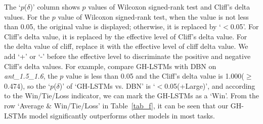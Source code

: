 \documentclass[journal]{IEEEtran}
\begin{document}
The `$p$($\delta$)' column shows $p$ values of Wilcoxon signed-rank test and Cliff's delta values. For the $p$ value of Wilcoxon signed-rank test, when the value is not less than 0.05, the original value is displayed; otherwise, it is replaced by `$<$0.05'. For Cliff's delta value, it is replaced by the effective level of Cliff's delta value. For the delta value of cliff, replace it with the effective level of cliff delta value. We add `+' or `-' before the effective level to discriminate the positive and negative Cliff's delta values. For example, compare GH-LSTMs with DBN on \textit{ant\_1.5\_1.6}, the $p$ value is less than 0.05 and the Cliff's delta value is 1.000($\geq$0.474), so the `$p$($\delta$)' of `GH-LSTMs vs. DBN' is `$<$0.05(+Large)', and according to the Win/Tie/Loss indicator, we can mark the GH-LSTMs as a `Win'. From the row `Average $\&$ Win/Tie/Loss' in Table~\ref{tab_f}, it can be seen that our GH-LSTMs model significantly outperforms other models in most tasks.
\end{document}
